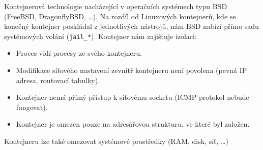 Kontejnerová technologie nacházející v operačních systémech typu BSD (FreeBSD, DragonflyBSD, \ldots).
Na rozdíl od Linuxových kontejnerů, kde se konečný kontejner poskládal z jednotlivých nástrojů, nám BSD nabízí přímo sadu systémových volání (\verb|jail_*|).
Kontejner nám zajišťuje izolaci:

\begin{itemize}
	\item Proces vidí procesy ze svého kontejneru.
	\item Modifikace síťového nastavení zevnitř kontejneru není povolena (pevná IP adresa, routovací tabulky).
	\item Kontejner nemá přímý přístup k síťovému socketu (ICMP protokol nebude fungovat).
	\item Kontejner je omezen pouze na adresářovou strukturu, ve které byl založen.
\end{itemize}

Kontejneru lze také omezovat systémové prostředky (RAM, disk, síť, \ldots)


